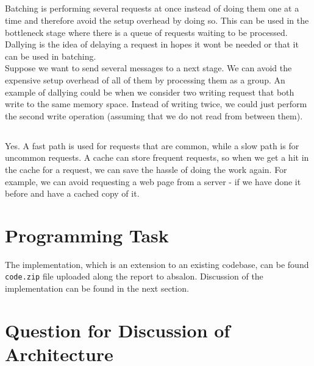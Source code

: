 \documentclass[a4paper]{article}
\begin{document}
\subsection{}
Batching is performing several requests at once instead of doing them one at a time and therefore avoid the setup overhead by doing so. This can be used in the bottleneck stage where there is a queue of requests waiting to be processed. Dallying is the idea of delaying a request in hopes it wont be needed or that it can be used in batching. \\
Suppose we want to send several messages to a next stage. We can avoid the expensive setup overhead of all of them by processing them as a group. An example of dallying could be when we consider two writing request that both write to the same memory space. Instead of writing twice, we could just perform the second write operation (assuming that we do not read from between them).

\subsection{}
Yes. A fast path is used for requests that are common, while a slow path is for uncommon requests. A cache can store frequent requests, so when we get a hit in the cache for a request, we can save the hassle of doing the work again. For example, we can avoid requesting a web page from a server - if we have done it before and have a cached copy of it.

\section{Programming Task}
The implementation, which is an extension to an existing codebase, can be found \texttt{code.zip} file uploaded along the report to absalon. Discussion of the implementation can be found in the next section.

\section{Question for Discussion of Architecture}

\subsection{}
\end{document}
